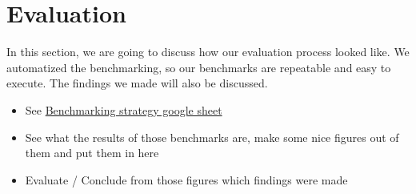 \section{Evaluation}
In this section, we are going to discuss how our evaluation process looked like. We automatized the benchmarking, so our benchmarks are repeatable and easy to execute. The findings we made will also be discussed.

\begin{itemize}
\item See \href{https://drive.google.com/drive/folders/1KhEb6TT2YXKUlSJx2sdfR44ZhWUSHnXN}{Benchmarking strategy google sheet}
\item See what the results of those benchmarks are, make some nice figures out of them and put them in here
\item Evaluate / Conclude from those figures which findings were made
\end{itemize}


